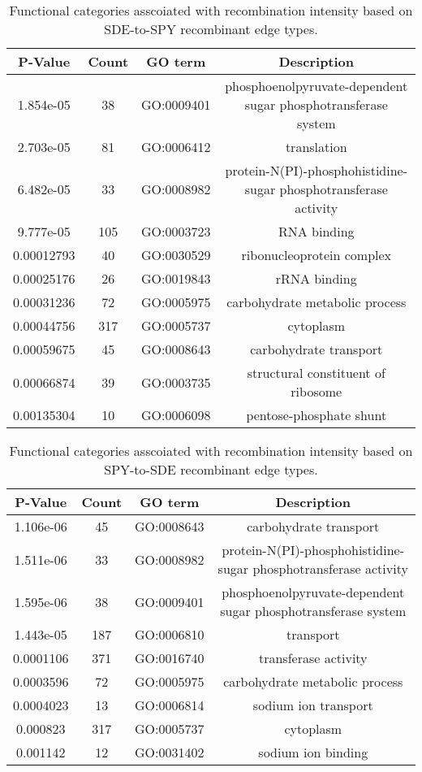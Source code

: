 \documentclass[english]{article}
\providecommand{\tabularnewline}{\\}
\begin{document}
\begin{table}
\caption{\label{tab:functional-sde-spy}Functional categories asscoiated with 
recombination intensity based on SDE-to-SPY recombinant edge types.}
\begin{tabular}{cccc}
\hline 
P-Value & Count & GO term & Description\tabularnewline
\hline 
1.854e-05 & 38 & GO:0009401 & phosphoenolpyruvate-dependent sugar phosphotransferase system\tabularnewline
2.703e-05 & 81 & GO:0006412 & translation\tabularnewline
6.482e-05 & 33 & GO:0008982 & protein-N(PI)-phosphohistidine-sugar phosphotransferase activity\tabularnewline
9.777e-05 & 105 & GO:0003723 & RNA binding\tabularnewline
0.00012793 & 40 & GO:0030529 & ribonucleoprotein complex\tabularnewline
0.00025176 & 26 & GO:0019843 & rRNA binding\tabularnewline
0.00031236 & 72 & GO:0005975 & carbohydrate metabolic process\tabularnewline
0.00044756 & 317 & GO:0005737 & cytoplasm\tabularnewline
0.00059675 & 45 & GO:0008643 & carbohydrate transport\tabularnewline
0.00066874 & 39 & GO:0003735 & structural constituent of ribosome\tabularnewline
0.00135304 & 10 & GO:0006098 & pentose-phosphate shunt\tabularnewline
\hline 
\end{tabular}
\end{table}
\clearpage{}

\begin{table}
\caption{\label{tab:functional-spy-sde}Functional categories asscoiated with 
recombination intensity based on SPY-to-SDE recombinant edge types.}
\begin{tabular}{cccc}
\hline 
P-Value & Count & GO term & Description\tabularnewline
\hline 
1.106e-06 & 45 & GO:0008643 & carbohydrate transport\tabularnewline
1.511e-06 & 33 & GO:0008982 & protein-N(PI)-phosphohistidine-sugar phosphotransferase activity\tabularnewline
1.595e-06 & 38 & GO:0009401 & phosphoenolpyruvate-dependent sugar phosphotransferase system\tabularnewline
1.443e-05 & 187 & GO:0006810 & transport\tabularnewline
0.0001106 & 371 & GO:0016740 & transferase activity\tabularnewline
0.0003596 & 72 & GO:0005975 & carbohydrate metabolic process\tabularnewline
0.0004023 & 13 & GO:0006814 & sodium ion transport\tabularnewline
0.000823 & 317 & GO:0005737 & cytoplasm\tabularnewline
0.001142 & 12 & GO:0031402 & sodium ion binding\tabularnewline
\hline 
\end{tabular}
\end{table}
\clearpage{}
\end{document}
